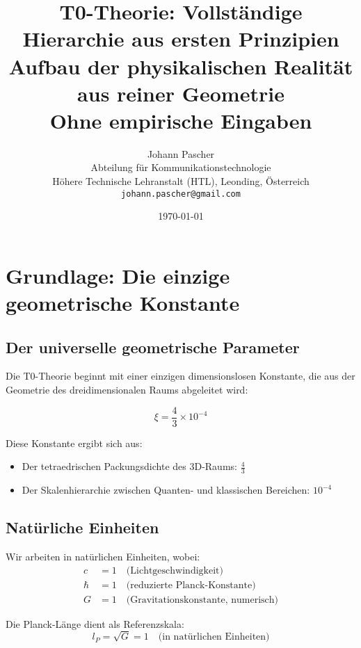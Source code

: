 \documentclass[12pt,a4paper]{article}
\title{\textbf{T0-Theorie: Vollständige Hierarchie aus ersten Prinzipien}\\[0.5cm]
	\large Aufbau der physikalischen Realität aus reiner Geometrie\\[0.3cm]
	\normalsize Ohne empirische Eingaben}
\author{Johann Pascher\\
	Abteilung für Kommunikationstechnologie\\
	Höhere Technische Lehranstalt (HTL), Leonding, Österreich\\
	\texttt{johann.pascher@gmail.com}}
\date{\today}
\newcommand{\lP}{l_P}
\newcommand{\xipar}{\xi}
\begin{document}
	\maketitle
	\tableofcontents
	\newpage
	
	\section{Grundlage: Die einzige geometrische Konstante}
	
	\subsection{Der universelle geometrische Parameter}
	
	Die T0-Theorie beginnt mit einer einzigen dimensionslosen Konstante, die aus der Geometrie des dreidimensionalen Raums abgeleitet wird:
	
	\begin{keyresult}
		\begin{equation}
			\boxed{\xipar = \frac{4}{3} \times 10^{-4}}
		\end{equation}
	\end{keyresult}
	
	Diese Konstante ergibt sich aus:
	\begin{itemize}
		\item Der tetraedrischen Packungsdichte des 3D-Raums: $\frac{4}{3}$
		\item Der Skalenhierarchie zwischen Quanten- und klassischen Bereichen: $10^{-4}$
	\end{itemize}
	
	\subsection{Natürliche Einheiten}
	Wir arbeiten in natürlichen Einheiten, wobei:
	\begin{align}
		c &= 1 \quad \text{(Lichtgeschwindigkeit)} \\
		\hbar &= 1 \quad \text{(reduzierte Planck-Konstante)} \\
		G &= 1 \quad \text{(Gravitationskonstante, numerisch)}
	\end{align}
	
	Die Planck-Länge dient als Referenzskala:
	\begin{equation}
		\lP = \sqrt{G} = 1 \quad \text{(in natürlichen Einheiten)}
	\end{equation}
	
\end{document}
